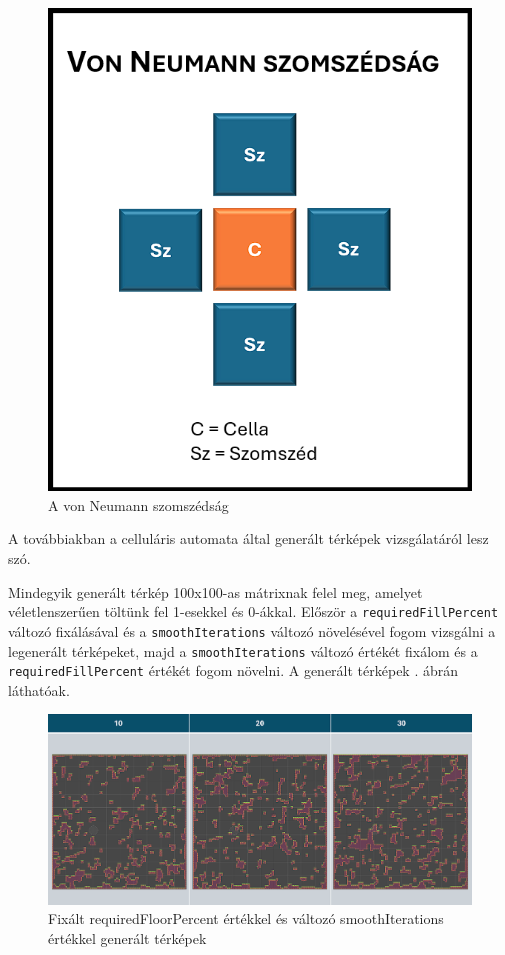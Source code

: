\begin{figure}[ht]
\centering
\includegraphics[scale = 0.4]{images/vonNeumann.png}
\caption{A von Neumann szomszédság}
\label{fig:vonNeumann}
\end{figure}

\newpage
A továbbiakban a celluláris automata által generált térképek vizsgálatáról lesz szó.

Mindegyik generált térkép 100x100-as mátrixnak felel meg, amelyet véletlenszerűen töltünk fel 1-esekkel és 0-ákkal. Először a \texttt{requiredFillPercent} változó fixálásával és a \texttt{smoothIterations} változó növelésével fogom vizsgálni a legenerált térképeket, majd a \texttt{smoothIterations} változó értékét fixálom és a \texttt{requiredFillPercent} értékét fogom növelni. A generált térképek . ábrán láthatóak.

\begin{figure}[ht]
\centering
\includegraphics[width=\textwidth]{images/fixedpercentcellular.png}
\caption{Fixált requiredFloorPercent értékkel és változó smoothIterations értékkel generált térképek}
\label{fig:fixedPercentCellular}
\end{figure}

